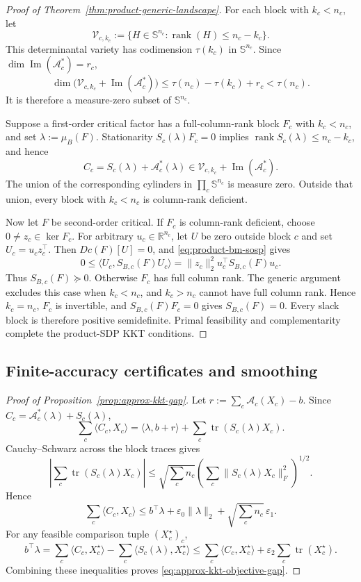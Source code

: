 \documentclass[11pt]{article}
\theoremstyle{definition}
\theoremstyle{remark}
\begin{document}
\begin{proof}[Proof of Theorem~\ref{thm:product-generic-landscape}]
For each block with $k_c<n_c$, let
\[
  \mathcal V_{c,k_c}
  :=\{H\in\mathbb S^{n_c}:
          \operatorname{rank}(H)\leq n_c-k_c\}.
\]
This determinantal variety has codimension $\tau(k_c)$ in
$\mathbb S^{n_c}$.  Since
$\dim\operatorname{Im}(\mathcal A_c^*)=r_c$,
\[
  \dim\bigl(
    \mathcal V_{c,k_c}+\operatorname{Im}(\mathcal A_c^*)
  \bigr)
  \leq \tau(n_c)-\tau(k_c)+r_c
  <\tau(n_c).
\]
It is therefore a measure-zero subset of $\mathbb S^{n_c}$.

Suppose a first-order critical factor has a full-column-rank block $F_c$
with $k_c<n_c$, and set $\lambda:=\mu_B(F)$.  Stationarity
$S_c(\lambda)F_c=0$ implies
$\operatorname{rank}S_c(\lambda)\leq n_c-k_c$, and hence
\[
  C_c
  =S_c(\lambda)+\mathcal A_c^*(\lambda)
  \in
  \mathcal V_{c,k_c}+\operatorname{Im}(\mathcal A_c^*).
\]
The union of the corresponding cylinders in
$\prod_c\mathbb S^{n_c}$ is measure zero.  Outside that union, every block
with $k_c<n_c$ is column-rank deficient.

Now let $F$ be second-order critical.  If $F_c$ is column-rank deficient,
choose $0\neq z_c\in\ker F_c$.  For arbitrary
$u_c\in\mathbb R^{n_c}$, let $U$ be zero outside block $c$ and set
$U_c=u_cz_c^\top$.  Then $Dc(F)[U]=0$, and
\eqref{eq:product-bm-sosp} gives
\[
  0\leq
  \langle U_c,S_{B,c}(F)U_c\rangle
  =\|z_c\|_2^2u_c^\top S_{B,c}(F)u_c.
\]
Thus $S_{B,c}(F)\succeq0$.  Otherwise $F_c$ has full column rank.  The
generic argument excludes this case when $k_c<n_c$, and $k_c>n_c$ cannot
have full column rank.  Hence $k_c=n_c$, $F_c$ is invertible, and
$S_{B,c}(F)F_c=0$ gives $S_{B,c}(F)=0$.  Every slack block is therefore
positive semidefinite.  Primal feasibility and complementarity complete the
product-SDP KKT conditions.
\end{proof}

\subsection{Finite-accuracy certificates and smoothing}

\begin{proof}[Proof of Proposition~\ref{prop:approx-kkt-gap}]
Let $r:=\sum_c\mathcal A_c(X_c)-b$.  Since
$C_c=\mathcal A_c^*(\lambda)+S_c(\lambda)$,
\[
  \sum_c\langle C_c,X_c\rangle
  =\langle\lambda,b+r\rangle
   +\sum_c\operatorname{tr}(S_c(\lambda)X_c).
\]
Cauchy--Schwarz across the block traces gives
\[
  \left|\sum_c\operatorname{tr}(S_c(\lambda)X_c)\right|
  \leq
  \sqrt{\sum_c n_c}
  \left(\sum_c\|S_c(\lambda)X_c\|_F^2\right)^{1/2}.
\]
Hence
\[
  \sum_c\langle C_c,X_c\rangle
  \leq
  b^\top\lambda
  +\varepsilon_0\|\lambda\|_2
  +\sqrt{\sum_c n_c}\,\varepsilon_1.
\]
For any feasible comparison tuple $(X_c^\star)_c$,
\[
  b^\top\lambda
  =\sum_c\langle C_c,X_c^\star\rangle
   -\sum_c\langle S_c(\lambda),X_c^\star\rangle
  \leq
  \sum_c\langle C_c,X_c^\star\rangle
  +\varepsilon_2\sum_c\operatorname{tr}(X_c^\star).
\]
Combining these inequalities proves
\eqref{eq:approx-kkt-objective-gap}.
\end{proof}
\end{document}
